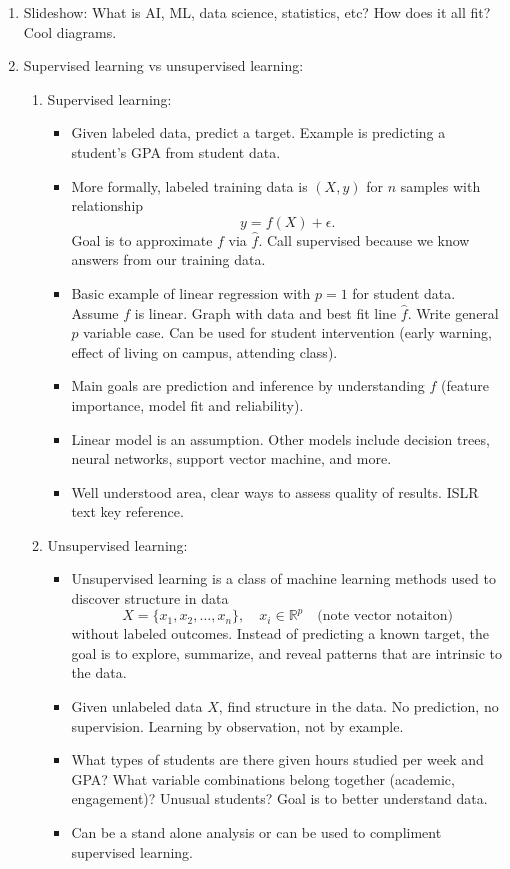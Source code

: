 \documentclass{article}
\begin{document}
\begin{enumerate}

\item Slideshow: What is AI, ML, data science, statistics, etc? How does it all fit? Cool diagrams.


\item Supervised learning vs unsupervised learning:
\begin{enumerate}
\item Supervised learning:
\begin{itemize}
\item Given labeled data, predict a target. Example is predicting a student's GPA from student data.
\item More formally, labeled training data is $(X, y)$ for $n$ samples with relationship
\[
y = f(X) + \epsilon.
\]
Goal is to approximate $f$ via $\hat{f}$. Call supervised because we know answers from our training data.
\item Basic example of linear regression with $p=1$ for student data. Assume $f$ is linear. Graph with data and best fit line $\hat{f}$. Write general $p$ variable case. Can be used for student intervention (early warning, effect of living on campus, attending class). 
\item Main goals are prediction and inference by understanding $f$ (feature importance, model fit and reliability).
\item Linear model is an assumption. Other models include decision trees, neural networks, support vector machine, and more.
\item Well understood area, clear ways to assess quality of results. ISLR text key reference.
\end{itemize}
\item Unsupervised learning:
\begin{itemize}
\item Unsupervised learning is a class of machine learning methods used to discover structure in data
\[
X = \{ x_1, x_2, \dots, x_n \}, \quad x_i \in \mathbb{R}^p \quad \text{(note vector notaiton)}
\] without labeled outcomes. Instead of predicting a known target, the goal is to explore, summarize, and reveal patterns that are intrinsic to the data.
\item Given unlabeled data $X$, find structure in the data. No prediction, no supervision. Learning by observation, not by example.
\item What types of students are there given hours studied per week and GPA? What variable combinations belong together (academic, engagement)? Unusual students? Goal is to better understand data.
\item Can be a stand alone analysis or can be used to compliment supervised learning.
\end{itemize}
\end{enumerate}


\end{enumerate}
\end{document}
